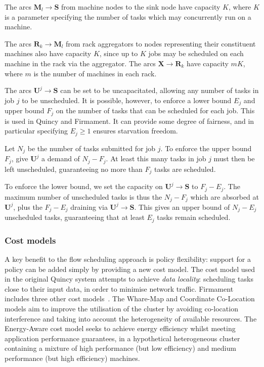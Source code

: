The arcs $\mathbf{M}_l \to \mathbf{S}$ from machine nodes to the sink node have capacity $K$, where $K$ is a parameter specifying the number of tasks which may concurrently run on a machine\footnotemark.

The arcs $\mathbf{R}_k \to \mathbf{M}_l$ from rack aggregators to nodes representing their constituent machines also have capacity $K$, since up to $K$ jobs may be scheduled on each machine in the rack via the aggregator. The arcs $\mathbf{X} \to \mathbf{R}_k$ have capacity $mK$, where $m$ is the number of machines in each rack.

The arcs $\mathbf{U}^j \to \mathbf{S}$ can be set to be uncapacitated, allowing any number of tasks in job $j$ to be unscheduled. It is possible, however, to enforce a lower bound $E_j$ and upper bound $F_j$ on the number of tasks that can be scheduled for each job. This is used in Quincy and Firmament. It can provide some degree of fairness, and in particular specifying $E_j \geq 1$ ensures starvation freedom.

Let $N_j$ be the number of tasks submitted for job $j$. To enforce the upper bound $F_j$, give $\mathbf{U}^j$ a demand of $N_j - F_j$. At least this many tasks in job $j$ must then be left unscheduled, guaranteeing no more than $F_j$ tasks are scheduled.

To enforce the lower bound, we set the capacity on $\mathbf{U}^j \to \mathbf{S}$ to $F_j - E_j$. The maximum number of unscheduled tasks is thus the $N_j - F_j$ which are absorbed at $\mathbf{U}^j$, plus the $F_j - E_j$ draining via $\mathbf{U}^j \to \mathbf{S}$. This gives an upper bound of $N_j - E_j$ unscheduled tasks, guaranteeing that at least $E_j$ tasks remain scheduled.

\subsubsection{Cost models}  

A key benefit to the flow scheduling approach is policy flexibility: support for a policy can be added simply by providing a new cost model. The cost model used in the original Quincy system attempts to achieve \emph{data locality}: scheduling tasks close to their input data, in order to minimise network traffic. Firmament includes three other cost models~\cite[ch.~5]{Schwarzkopf:2015}. The Whare-Map and Coordinate Co-Location models aim to improve the utilisation of the cluster by avoiding co-location interference and taking into account the heterogeneity of available resources. The Energy-Aware cost model seeks to achieve energy efficiency whilst meeting application performance guarantees, in a hypothetical heterogeneous cluster containing a mixture of high performance (but low efficiency) and medium performance (but high efficiency) machines.

